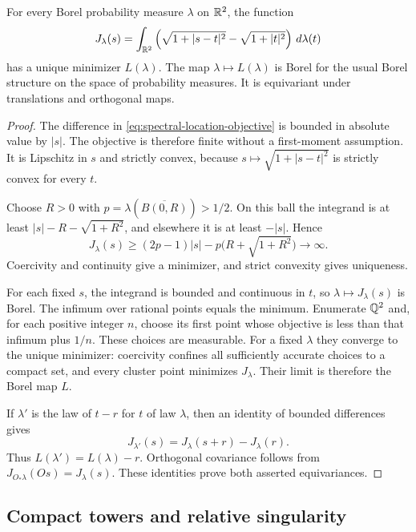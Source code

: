 \begin{lemma}\label{lem:spectral-location}
For every Borel probability measure $\lambda$ on $\mathbb R^2$, the function
\begin{equation}\label{eq:spectral-location-objective}
 J_\lambda(s)=\int_{\mathbb R^2}
 \left(\sqrt{1+|s-t|^2}-\sqrt{1+|t|^2}\right)\,d\lambda(t)
\end{equation}
has a unique minimizer $L(\lambda)$. The map $\lambda\mapsto L(\lambda)$
is Borel for the usual Borel structure on the space of probability
measures. It is equivariant under translations and orthogonal maps.
\end{lemma}

\begin{proof}
The difference in \eqref{eq:spectral-location-objective} is bounded in
absolute value by $|s|$. The objective is therefore finite without a
first-moment assumption. It is Lipschitz in $s$ and strictly convex,
because $s\mapsto\sqrt{1+|s-t|^2}$ is strictly convex for every $t$.

Choose $R>0$ with $p=\lambda(\overline{B(0,R)})>1/2$. On this ball the
integrand is at least $|s|-R-\sqrt{1+R^2}$, and elsewhere it is at least
$-|s|$. Hence
\[
 J_\lambda(s)\ge
 (2p-1)|s|-p\bigl(R+\sqrt{1+R^2}\bigr)\longrightarrow\infty.
\]
Coercivity and continuity give a minimizer, and strict convexity gives
uniqueness.

For each fixed $s$, the integrand is bounded and continuous in $t$, so
$\lambda\mapsto J_\lambda(s)$ is Borel. The infimum over rational
points equals the minimum. Enumerate $\mathbb Q^2$ and, for each positive
integer $n$, choose its first point whose objective is less than that
infimum plus $1/n$. These choices are measurable. For a fixed $\lambda$
they converge to the unique minimizer: coercivity confines all sufficiently
accurate choices to a compact set, and every cluster point minimizes
$J_\lambda$. Their limit is therefore the Borel map $L$.

If $\lambda'$ is the law of $t-r$ for $t$ of law $\lambda$, then an
identity of bounded differences gives
\[
 J_{\lambda'}(s)=J_\lambda(s+r)-J_\lambda(r).
\]
Thus $L(\lambda')=L(\lambda)-r$. Orthogonal covariance follows from
$J_{O_*\lambda}(Os)=J_\lambda(s)$. These identities prove both asserted
equivariances.
\end{proof}

\subsection{Compact towers and relative singularity}

